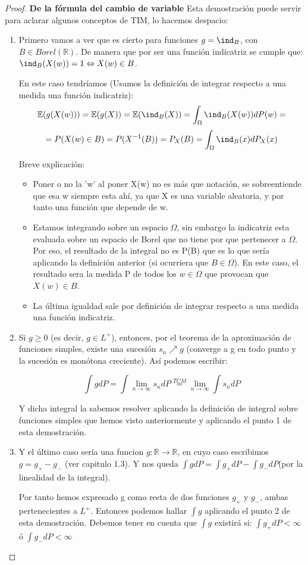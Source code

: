 \documentclass{apuntes}
\begin{document}
\begin{proof}
\textbf{De la fórmula del cambio de variable} Esta demostración puede servir para aclarar algunos conceptos de TIM, lo hacemos despacio:

\begin{enumerate}
\item Primero vamos a ver que es cierto para funciones $g=\ind_{B}$, con $B \in Borel(\mathbb{R})$. De manera que por ser una función indicatriz se cumple que: $\ind_{B}(X(w))=1 \Leftrightarrow X(w) \in B$. 

En este caso tendríamos (Usamos la definición de integrar respecto a una medida una función indicatriz):
\[
\mathbb{E}(g(X(w))) = \mathbb{E}(g(X)) = \mathbb{E}(\ind_{B}(X))=\int_{\Omega}\ind_{B}(X(w))dP(w) =
\]
\[
= P(X(w)\in B) = P(X^{-1}(B))=P_X(B)=\int_{\Omega}\ind_{B}(x)dP_X(x)
\] 

Breve explicación: 
\begin{itemize}
\item Poner o no la 'w' al poner X(w) no es más que notación, se sobreentiende que esa w siempre esta ahí, ya que X es una variable aleatoria, y por tanto una función que depende de w.
\item Estamos integrando sobre un espacio $\Omega$, sin embargo la indicatriz esta evaluada sobre un espacio de Borel que no tiene por que pertenecer a $\Omega$. Por eso, el resultado de la integral no es P(B) que es lo que sería aplicando la definición anterior (si ocurriera que $B\in \Omega$). En este caso, el resultado sera la medida P de todos los $w \in \Omega$ que provocan que $X(w) \in B$.
\item La última igualdad sale por definición de integrar respecto a una medida una función indicatriz.
\end{itemize}
\item Si $g \geq 0$ (es decir, $g \in L^+$), entonces, por el teorema de la aproximación de funciones simples, existe una sucesión $s_n\nearrow g$ (converge a g en todo punto y la sucesión es monótona creciente). Así podemos escribir:

\[
\int g dP = \int \lim_{n \rightarrow \infty}s_n dP \stackrel{TCM}{=} \lim_{n \rightarrow \infty}\int s_n dP
\]

Y dicha integral la sabemos resolver aplicando la definición de integral sobre funciones simples que hemos visto anteriormente y aplicando el punto 1 de esta demostración.
\item Y el último caso sería una funcion $g:\mathbb{R} \rightarrow \mathbb{R}$, en cuyo caso escribimos $g=g_+-g_-$ (ver capitulo 1.3). Y nos queda $\int gdP = \int g_+dP -\int g_-dP$(por la linealidad de la integral).

Por tanto hemos expresado g como resta de dos funciones $g_+$ y $g_-$, ambas pertenecientes a $L^+$. Entonces podemos hallar $\int g$ aplicando el punto 2 de esta demostración. Debemos tener en cuenta que $\int g$ existirá si: $\int g_+dP < \infty$ ó $\int g_-dP < \infty$

\end{enumerate}
\end{proof}
\end{document}
